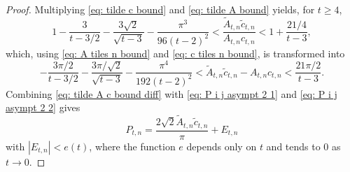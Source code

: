\documentclass[12pt, a4paper]{article}
\newcommand{\tiles}{t} %
\begin{document}
\begin{proof}
Multiplying \eqref{eq: tilde c bound} and \eqref{eq: tilde A bound} yields, for $\tiles \geq 4$,
\begin{equation}
\label{eq: tilde A c bound rel}
1 - \frac {3} {\tiles-3/2} - \frac{3\sqrt{2}}  {\sqrt{\tiles-3}} - \frac {\pi^3} {96(\tiles-2)^2} < \frac{\tilde A_{\tiles,n} \tilde c_{\tiles,n}}{A_{\tiles,n} c_{\tiles,n}} < 1+\frac {21/4} {\tiles-3},
\end{equation}
which, using \eqref{eq: A tiles n bound} and \eqref{eq: c tiles n bound}, is transformed into 
\begin{equation}
\label{eq: tilde A c bound diff}
- \frac {3\pi/2} {\tiles-3/2} - \frac{3\pi/\sqrt{2}}  {\sqrt{\tiles-3}} - \frac {\pi^4} {192(\tiles-2)^2} < \tilde A_{\tiles,n} \tilde c_{\tiles,n}- A_{\tiles,n} c_{\tiles,n} < \frac {21\pi/2} {\tiles-3}.
\end{equation}
Combining \eqref{eq: tilde A c bound diff} with \eqref{eq: P i j asympt 2 1} and \eqref{eq: P i j asympt 2 2} gives
\begin{equation}
\label{eq: P i j asympt 3 bis}
P_{\tiles,n} = \frac{2\sqrt{2} \tilde A_{\tiles,n} \tilde c_{\tiles,n}}{\pi} + E_{\tiles, n}
\end{equation}
with $|E_{\tiles, n}| < e(\tiles)$, where the function $e$ depends only on $\tiles$ and tends to $0$ as $\tiles \rightarrow 0$.


\end{proof}
\end{document}
